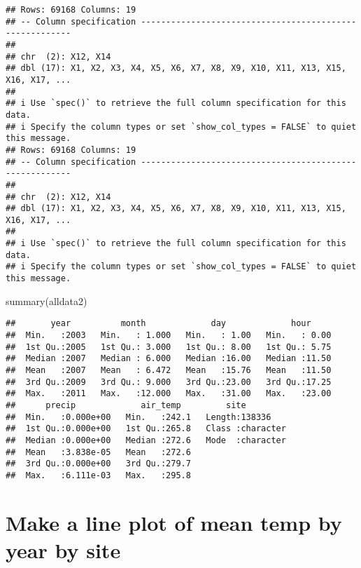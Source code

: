 \documentclass[
]{book}
\newenvironment{Shaded}{\begin{snugshade}}{\end{snugshade}}
\newcommand{\FunctionTok}[1]{\textcolor[rgb]{0.00,0.00,0.00}{#1}}
\newcommand{\NormalTok}[1]{#1}
\begin{document}
\begin{verbatim}
## Rows: 69168 Columns: 19
## -- Column specification --------------------------------------------------------
## 
## chr  (2): X12, X14
## dbl (17): X1, X2, X3, X4, X5, X6, X7, X8, X9, X10, X11, X13, X15, X16, X17, ...
## 
## i Use `spec()` to retrieve the full column specification for this data.
## i Specify the column types or set `show_col_types = FALSE` to quiet this message.
## Rows: 69168 Columns: 19
## -- Column specification --------------------------------------------------------
## 
## chr  (2): X12, X14
## dbl (17): X1, X2, X3, X4, X5, X6, X7, X8, X9, X10, X11, X13, X15, X16, X17, ...
## 
## i Use `spec()` to retrieve the full column specification for this data.
## i Specify the column types or set `show_col_types = FALSE` to quiet this message.
\end{verbatim}

\begin{Shaded}
\begin{Highlighting}[]
\FunctionTok{summary}\NormalTok{(alldata2)}
\end{Highlighting}
\end{Shaded}

\begin{verbatim}
##       year          month             day             hour      
##  Min.   :2003   Min.   : 1.000   Min.   : 1.00   Min.   : 0.00  
##  1st Qu.:2005   1st Qu.: 3.000   1st Qu.: 8.00   1st Qu.: 5.75  
##  Median :2007   Median : 6.000   Median :16.00   Median :11.50  
##  Mean   :2007   Mean   : 6.472   Mean   :15.76   Mean   :11.50  
##  3rd Qu.:2009   3rd Qu.: 9.000   3rd Qu.:23.00   3rd Qu.:17.25  
##  Max.   :2011   Max.   :12.000   Max.   :31.00   Max.   :23.00  
##      precip             air_temp         site          
##  Min.   :0.000e+00   Min.   :242.1   Length:138336     
##  1st Qu.:0.000e+00   1st Qu.:265.8   Class :character  
##  Median :0.000e+00   Median :272.6   Mode  :character  
##  Mean   :3.838e-05   Mean   :272.6                     
##  3rd Qu.:0.000e+00   3rd Qu.:279.7                     
##  Max.   :6.111e-03   Max.   :295.8
\end{verbatim}

\hypertarget{make-a-line-plot-of-mean-temp-by-year-by-site}{%
\section{Make a line plot of mean temp by year by site}\label{make-a-line-plot-of-mean-temp-by-year-by-site}}
\end{document}
